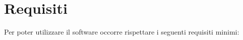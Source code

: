 \section{Requisiti}
Per poter utilizzare il software occorre rispettare i seguenti
requisiti minimi:  



